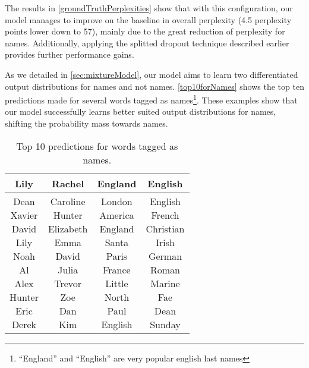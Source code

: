 The results in \autoref{groundTruthPerplexities} show that with this configuration, our model manages to improve on the baseline in overall perplexity (4.5 perplexity points lower down to 57), mainly due to the great reduction of perplexity for names. Additionally, applying the splitted dropout technique described earlier provides further performance gains.

As we detailed in \autoref{sec:mixtureModel}, our model aims to learn two differentiated output distributions for names and not names. \autoref{top10forNames} shows the top ten predictions made for several words tagged as names\footnote{``England'' and ``English'' are very popular english last names}. These examples show that our model successfully learns better suited output distributions for names, shifting the probability mass towards names. 

\begin{table}[H]
	\centering
	\begin{tabular}{|c|c|c|c|}
		\hline
		Lily & Rachel & England & English \\ \hline
		\makecell{Dean\\Xavier\\David\\Lily\\Noah\\Al\\Alex\\Hunter\\Eric\\Derek} & \makecell{Caroline\\Hunter\\Elizabeth\\Emma\\David\\Julia\\Trevor\\Zoe\\Dan\\Kim} & \makecell{London\\America\\England\\Santa\\Paris\\France\\Little\\North\\Paul\\English} & \makecell{English\\French\\Christian\\Irish\\German\\Roman\\Marine\\Fae\\Dean\\Sunday} \\ \hline
	\end{tabular}
	\caption{Top 10 predictions for words tagged as names.}
	\label{top10forNames}
\end{table}


